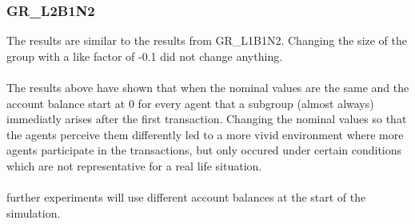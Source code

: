 \documentclass[twoside,openright]{uva-bachelor-thesis}
\begin{document}
\subsubsection{GR\_L2B1N2}
The results are similar to the results from GR\_L1B1N2.  Changing the size of the group with a like factor of -0.1 did not change anything. 
\\
\\
The results above have shown that when the nominal values are the same and the account balance start at 0 for every agent that a subgroup (almost always) immediatly arises after the first transaction. Changing the nominal values so that the agents perceive them differently led to a more vivid environment where more agents participate in the transactions, but only occured under certain conditions which are not representative for a real life situation. 
\\
\\
further experiments will use different account balances at the start of the simulation.
\end{document}
